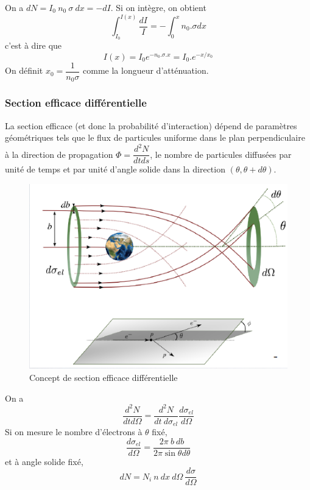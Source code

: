 \vspace{0,2cm}
On a $dN=I_0~n_0~\sigma~dx=-dI$. Si on intègre, on obtient
    \[
        \int_{I_{0}}^{I(x)}\dfrac{dI}{I}=-\int_0^x n_0.\sigma dx
    \]
c'est à dire que
    \[
        I(x)=I_0e^{-n_0.\sigma.x}=I_0.e^{-x/x_0}
    \]
On définit $x_0=\dfrac{1}{n_0\sigma}$ comme la longueur d'atténuation.
    
    \subsubsection{Section efficace différentielle}
    
    La section efficace (et donc la probabilité d'interaction) dépend de paramètres géométriques tels que le flux de particules uniforme dans le plan perpendiculaire à la direction de propagation $\Phi=\dfrac{d^2N}{dtds}$, le nombre de particules diffusées par unité de temps et par unité d'angle solide dans la direction $(\theta, \theta+d\theta)$. 

    \begin{figure}[ht]
        \centering
        \includegraphics[scale=0.75]{Images1/section_efficace_diff.PNG}
        \caption{Concept de section efficace différentielle}
    \end{figure}
On a 
    \[
        \dfrac{d^2N}{dtd\Omega}=\dfrac{d^2N}{dt~d\sigma_{el}}\dfrac{d\sigma_{el}}{d\Omega}
    \]
Si on mesure le nombre d'électrons à $\theta$ fixé,
    \[
        \dfrac{d\sigma_{el}}{d\Omega}=\dfrac{2\pi~b~db}{2\pi \sin{\theta}d\theta}
    \]
et à angle solide fixé,
    \[
        dN=N_i~n~dx~d\Omega~\dfrac{d\sigma}{d\Omega}
    \]
    
